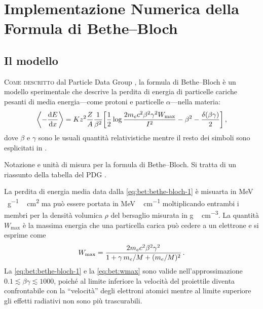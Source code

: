 \chapter[Implementazione numerica della Formula di Bethe--Bloch][Formula di Bethe--Bloch]{Implementazione Numerica della Formula di Bethe--Bloch}\label{ch:bet}

\section{Il modello}
    \lettrine[loversize=0.08, lines=2]{C}{ome descritto} dal Particle Data Group \cite{PhysRevD-110-030001}, la formula di Bethe--Bloch è un modello sperimentale che descrive la perdita di energia di particelle cariche pesanti di media energia---come protoni e particelle $\alpha$---nella materia:
    \begin{equation}
        \left\langle -\dv{E}{x}\right\rangle
        = Kz^2 \frac{Z}{A}\frac{1}{\beta^2}\bqty{\frac{1}{2}\log\frac{2 m_e c^2 \beta^2 \gamma^2 W_\text{max}}{I^2} - \beta^2 - \frac{\delta\pqty{\beta\gamma}}{2}}
        \mycomma
        \label{eq:bet:bethe-bloch-1}
    \end{equation}
    dove $\beta$ e $\gamma$ sono le usuali quantità relativistiche mentre il resto dei simboli sono esplicitati in .
    \begin{table}
        \footnotesize
        \centering
        
        \caption{Notazione e unità di misura per la formula di Bethe--Bloch. Si tratta di un riassunto della tabella del PDG \cite{PhysRevD-110-030001}.}
        \label{tab:bet:costanti}
    \end{table}
    La perdita di energia media data dalla \eqref{eq:bet:bethe-bloch-1} è misuarta in \unit{\mega\eV\,\gram^{-1}\,\centi\meter^2} ma può essere portata in \unit{\mega\eV\,\centi\meter^{-1}} moltiplicando entrambi i membri per la densità volumica $\rho$ del bersaglio misurata in \unit{\gram\,\centi\meter^{-3}}. La quantità $W_\text{max}$ è la massima energia che una particella carica può cedere a un elettrone e si esprime come
    \begin{equation}
        W_\text{max} = \frac{2 m_e c^2 \beta^2 \gamma^2}{1 + \gamma\, m_e / M + (m_e / M)^2}
        \,. 
        \label{eq:bet:wmax}
    \end{equation}
    La \eqref{eq:bet:bethe-bloch-1} e la \eqref{eq:bet:wmax} sono valide nell'approssimazione $\num{0.1} \lesssim \beta\gamma \lesssim \num{1000}$, poiché al limite inferiore la velocità del proiettile diventa confrontabile con la ``velocità'' degli elettroni atomici mentre al limite superiore gli effetti radiativi non sono più trascurabili.

